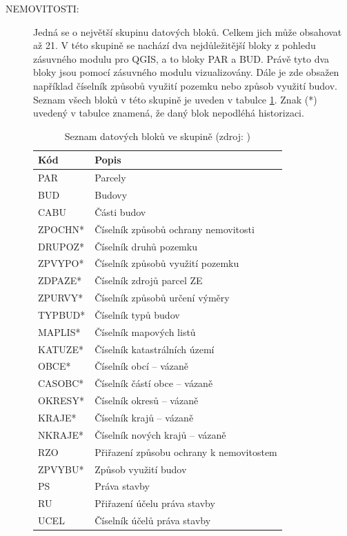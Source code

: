 \documentclass[a4paper,12pt,oneside]{book}
\begin{document}
\begin{description}
 \item[NEMOVITOSTI:] Jedná se o největší skupinu datových bloků. Celkem jich může obsahovat až 21. V této skupině se nachází dva nejdůležitější bloky z pohledu zásuvného modulu pro QGIS, a to bloky PAR a BUD. Právě tyto dva bloky jsou pomocí zásuvného modulu vizualizovány. Dále je zde obsažen například číselník způsobů využití pozemku nebo způsob využití budov. Seznam všech bloků v této skupině je uveden v tabulce \ref{t_skupina_nemovitosti}. Znak (*) uvedený v tabulce znamená, že daný blok nepodléhá historizaci.
 
\begin{table}[htbp]
\centering
\caption[Seznam datových bloků ve skupině ]{Seznam datových bloků ve skupině  (zdroj: \cite{vfk_struktura})}
\begin{tabular}{ll}
\toprule
\textbf{Kód} & \textbf{Popis} \\ 
\midrule
PAR & Parcely \\ 
BUD & Budovy \\ 
CABU & Části budov \\ 
ZPOCHN* & Číselník způsobů ochrany nemovitosti \\
DRUPOZ* & Číselník druhů pozemku \\
ZPVYPO* & Číselník způsobů využití pozemku \\
ZDPAZE* & Číselník zdrojů parcel ZE \\
ZPURVY* & Číselník způsobů určení výměry \\
TYPBUD* & Číselník typů budov \\
MAPLIS* & Číselník mapových listů \\
KATUZE* & Číselník katastrálních území \\
OBCE* & Číselník obcí -- vázaně \\
CASOBC* & Číselník částí obce -- vázaně \\
OKRESY* & Číselník okresů -- vázaně \\
KRAJE* & Číselník krajů -- vázaně \\
NKRAJE* & Číselník nových krajů -- vázaně \\
RZO & Přiřazení způsobu ochrany k nemovitostem \\
ZPVYBU* & Způsob využití budov \\
PS & Práva stavby \\
RU & Přiřazení účelu práva stavby \\
UCEL & Číselník účelů práva stavby \\
\bottomrule
\end{tabular}
\label{t_skupina_nemovitosti}
\end{table}
 

\end{description}
\end{document}
